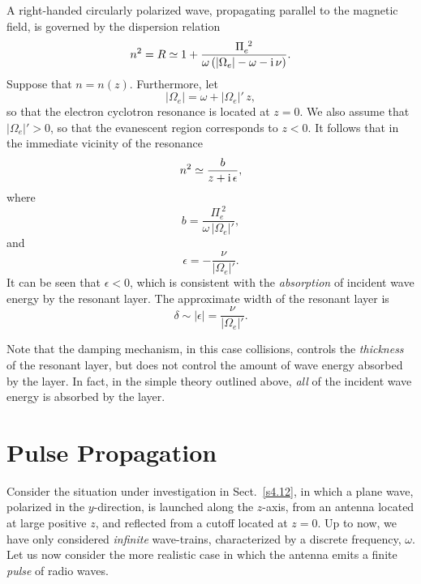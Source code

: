 A right-handed circularly polarized wave, propagating parallel to the
magnetic field, is governed by the dispersion relation 
\begin{equation}
n^2 = R \simeq 1+ \frac{{\Pi}_e^{~2}}{\omega\,(|{\Omega}_e|
-\omega - {\rm i}\,\nu)}.
\end{equation}
Suppose that $n=n(z)$. Furthermore, let
\begin{equation}
|{\Omega}_e| = \omega + |{\Omega}_e|'\,z,
\end{equation}
so that the electron cyclotron resonance is located at $z=0$. 
We also assume that $|{\Omega}_e|'>0$, so that the evanescent region
corresponds to $z<0$. 
It follows that in the immediate vicinity of the resonance
\begin{equation}
n^2 \simeq \frac{b}{z+ {\rm i}\,\epsilon},
\end{equation}
where
\begin{equation}
b = \frac{{\Pi}_e^{~2}}{\omega\,|{\Omega}_e|'},
\end{equation}
and 
\begin{equation}
\epsilon = -\frac{\nu}{|{\Omega_e}|'}.
\end{equation}
It can be seen that $\epsilon<0$, which is consistent with the
{\em absorption}\/  of incident wave energy by the resonant layer. The
approximate width of the resonant layer
is
\begin{equation}
\delta \sim |\epsilon| = \frac{\nu}{|{\Omega_e}|'}.
\end{equation}

Note that the damping mechanism, in this case collisions, controls the
{\em thickness}\/ of the resonant layer, but does not control the
amount of wave energy absorbed by the layer. In fact, in the simple
theory outlined above,
 {\em all}\/ of the incident wave energy is absorbed by the layer.

\section{Pulse Propagation}\label{s4.16}
Consider the situation under investigation in Sect.~\ref{s4.12}, in which a plane
wave, polarized in the $y$-direction, is launched along the $z$-axis, from
an antenna located at large positive $z$, and reflected from a cutoff located
at $z=0$. Up to now, we have only considered {\em infinite}\/ wave-trains, characterized
by a discrete frequency, $\omega$. Let us now consider the more realistic
case in which the antenna emits a finite {\em pulse}\/ of radio waves.

